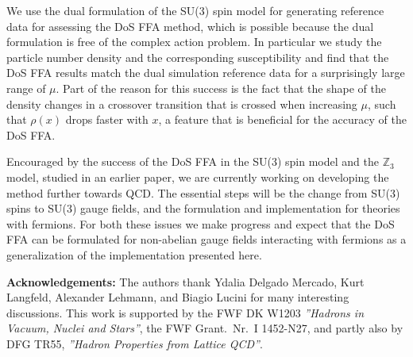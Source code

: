 \documentclass[a4paper,11pt]{article}
\begin{document}
We use the dual formulation of the SU(3) spin model for generating reference data for assessing the 
DoS FFA method, which is possible because the dual formulation is free of the complex action problem. 
In particular we study the particle number density and the corresponding susceptibility and find that the DoS FFA results 
match the dual simulation reference data for a surprisingly large range of $\mu$. 
Part of the reason for this success is the fact
that the shape of the density changes in a 
crossover transition that is crossed when increasing $\mu$, such that $\rho(x)$ drops faster with $x$,
a feature that is beneficial for the accuracy of the DoS FFA.
 
Encouraged by the success of the DoS FFA in the SU(3) spin model and the $\mathds{Z}_3$ model, studied in an earlier 
paper, we are currently working on developing the method further towards QCD. The essential steps will be the change 
from SU(3) spins to SU(3) gauge fields, and the formulation and implementation for theories with fermions. For both 
these issues we make progress and expect that the DoS FFA can be formulated for non-abelian gauge fields 
interacting with fermions as a generalization of the implementation presented here.

\vskip5mm
\noindent
{\bf Acknowledgements:} The authors thank Ydalia Delgado Mercado, Kurt Langfeld, Alexander Lehmann, 
and Biagio Lucini for many interesting discussions. This work is supported by the FWF DK W1203 
{\sl ''Hadrons in Vacuum, Nuclei and Stars''}, the FWF Grant.\ Nr.\ I 1452-N27, and partly also by 
DFG TR55, {\sl ''Hadron Properties from Lattice QCD''}.  
\end{document}
